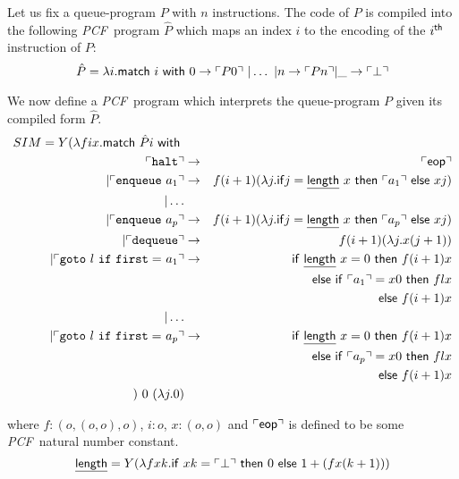 \documentclass{article}
\newcommand{\encode}[1]{\ulcorner #1 \urcorner}
\newcommand\eop{{\sf eop}}
\newcommand\pcf{\textsl{PCF}}
\begin{document}
Let us fix a queue-program $P$ with $n$ instructions. 
The code of $P$ is compiled into the following \pcf\ program $\hat{P}$
which maps an index $i$ to the encoding of the $i^{\sf th}$ instruction of $P$:
\begin{equation}
\hat{P} = \lambda i .  {\sf match\ } i {\sf \ with\ } 
   0 \rightarrow \encode{ P 0 } 
  \ | \ldots \ | n \rightarrow \encode{ P n }  | \_ \rightarrow \encode{\bot}
\end{equation} 

We now define a \pcf\ program which interprets the queue-program $P$ given  its compiled form $\hat{P}$.
\begin{eqnarray*}
SIM = Y ( \lambda f i x . {\sf match\ } \hat{P} i  {\sf \ with\ }   \\
 \encode{ \tt halt }&\rightarrow& \encode{\eop} \\
| \encode{ {\tt enqueue\ } a_1 } &\rightarrow& f (i+1) ( \lambda j . {\sf if} j = \underline{\sf length}\ x\ {\sf then\ } \encode{a_1} {\sf\ else\ } x j ) \\
| \ldots \\
| \encode{ {\tt enqueue\ } a_p } &\rightarrow& f (i+1) ( \lambda j . {\sf if} j = \underline{\sf length}\ x\ {\sf then\ } \encode{a_p} {\sf\ else\ } x j ) \\
| \encode{ {\tt dequeue } } &\rightarrow& f (i+1) (\lambda j . x (j+1) ) \\
| \encode{ {\tt goto\ } l {\tt\ if\ first=\ } a_1 } &\rightarrow&  
{\sf if\ } \underline{\sf length}\ x = 0 {\ \sf then\ } f (i+1) x \\
&&{\sf else\ if\ } \encode{a_1} = x 0 {\sf\ then\ } f l x \\
&&{\sf else\ } f (i+1) x \\
| \ldots \\
| \encode{{\tt goto\ } l {\tt\ if\ first=\ } a_p} &\rightarrow&  
{\sf if\ } \underline{\sf length}\ x = 0 {\ \sf then\ } f (i+1) x \\
&&{\sf else\ if\ } \encode{a_p} = x 0 {\sf\ then\ } f l x \\
&&{\sf else\ } f (i+1) x \\
)\ 0\ (\lambda j . 0)
\end{eqnarray*}

where $f: (o,(o,o),o)$, $i:o$, $x:(o,o)$ and $\encode{\eop}$ is defined to be some \pcf\ natural number constant.
$$ \underline{\sf  length}  = Y( \lambda f x k . {\sf if\ } x k = \encode{\bot} {\sf\ then\ } 0 {\sf\ else\ } 1 + (f x (k+1)))$$
\end{document}

